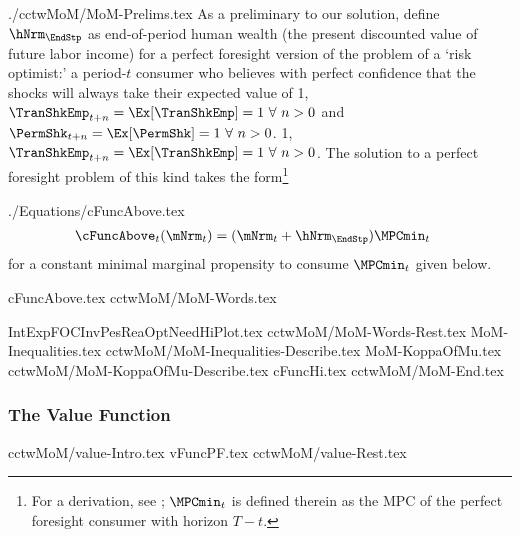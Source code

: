 \documentclass[titlepage,abstract]{\econtex}
\newcommand{\PermShkOn}{\ifthenelse{\boolean{PermShkVersion}}}
\begin{document}
\begin{verbatimwrite}{./cctwMoM/MoM-Prelims.tex}
  As a preliminary to our solution, define $\hNrm_{\EndStp}$ as
  end-of-period human wealth (the present discounted value
  of future labor income) for a perfect foresight version of the problem
  of a `risk optimist:' a period-$t$ consumer who believes with perfect confidence
  that the shocks will always take their expected value of 
  \PermShkOn
  {1, $\TranShkEmp_{t+n} = \Ex[\TranShkEmp]=1~\forall~n>0$ and $\PermShk_{t+n} = \Ex[\PermShk]=1~\forall~n>0$.}
  {1, $\TranShkEmp_{t+n} = \Ex[\TranShkEmp]=1~\forall~n>0$.}
  The solution to a perfect foresight problem of this kind takes the
  form\footnote{For a derivation, see \cite{BufferStockTheory}; $\MPCmin_{t}$ is defined therein as the MPC of the perfect foresight consumer with horizon $T-t$.}
\end{verbatimwrite}
\unskip
\begin{verbatimwrite}{./Equations/cFuncAbove.tex}
  \begin{equation}\begin{gathered}\begin{aligned}
        \cFuncAbove_{t}(\mNrm_{t})  & = (\mNrm_{t} + \hNrm_{\EndStp})\MPCmin_{t} \label{eq:cFuncAbove}
      \end{aligned}\end{gathered}\end{equation}
  for a constant minimal marginal propensity to consume $\MPCmin_{t}$ given below.
\end{verbatimwrite}
\unskip

{cFuncAbove.tex} 
{cctwMoM/MoM-Words.tex}

{IntExpFOCInvPesReaOptNeedHiPlot.tex}
{cctwMoM/MoM-Words-Rest.tex}
{MoM-Inequalities.tex}
{cctwMoM/MoM-Inequalities-Describe.tex}
{MoM-KoppaOfMu.tex}
{cctwMoM/MoM-KoppaOfMu-Describe.tex}
{cFuncHi.tex}
{cctwMoM/MoM-End.tex}

\subsubsection{The Value Function}

{cctwMoM/value-Intro.tex} %
{vFuncPF.tex} %
{cctwMoM/value-Rest.tex} %
\end{document}
